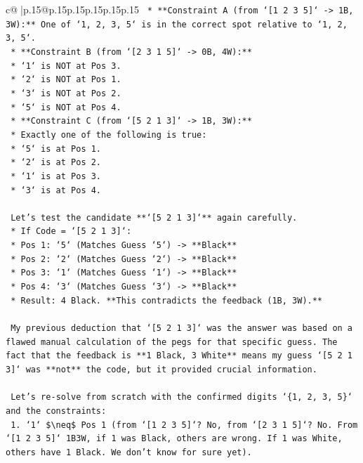 \documentclass{article}
\begin{document}
{\begin{supertabular}{c@{$\;$}|p{.15\linewidth}@{}p{.15\linewidth}p{.15\linewidth}p{.15\linewidth}p{.15\linewidth}p{.15\linewidth}}
{{{\texttt{    *   **Constraint A (from `{[}1 2 3 5{]}` {-}> 1B, 3W):** One of `1, 2, 3, 5` is in the correct spot relative to `1, 2, 3, 5`.} \\
\texttt{    *   **Constraint B (from `{[}2 3 1 5{]}` {-}> 0B, 4W):**} \\
\texttt{        *   `1` is NOT at Pos 3.} \\
\texttt{        *   `2` is NOT at Pos 1.} \\
\texttt{        *   `3` is NOT at Pos 2.} \\
\texttt{        *   `5` is NOT at Pos 4.} \\
\texttt{    *   **Constraint C (from `{[}5 2 1 3{]}` {-}> 1B, 3W):**} \\
\texttt{        *   Exactly one of the following is true:} \\
\texttt{            *   `5` is at Pos 1.} \\
\texttt{            *   `2` is at Pos 2.} \\
\texttt{            *   `1` is at Pos 3.} \\
\texttt{            *   `3` is at Pos 4.} \\
\\ 
\texttt{    Let's test the candidate **`{[}5 2 1 3{]}`** again carefully.} \\
\texttt{    *   If Code = `{[}5 2 1 3{]}`:} \\
\texttt{        *   Pos 1: `5` (Matches Guess `5`) {-}> **Black**} \\
\texttt{        *   Pos 2: `2` (Matches Guess `2`) {-}> **Black**} \\
\texttt{        *   Pos 3: `1` (Matches Guess `1`) {-}> **Black**} \\
\texttt{        *   Pos 4: `3` (Matches Guess `3`) {-}> **Black**} \\
\texttt{        *   Result: 4 Black. **This contradicts the feedback (1B, 3W).**} \\
\\ 
\texttt{    My previous deduction that `{[}5 2 1 3{]}` was the answer was based on a flawed manual calculation of the pegs for that specific guess. The fact that the feedback is **1 Black, 3 White** means my guess `{[}5 2 1 3{]}` was **not** the code, but it provided crucial information.} \\
\\ 
\texttt{    Let's re{-}solve from scratch with the confirmed digits `\{1, 2, 3, 5\}` and the constraints:} \\
\texttt{    1.  `1` \$\textbackslash{}neq\$ Pos 1 (from `{[}1 2 3 5{]}`? No, from `{[}2 3 1 5{]}`? No. From `{[}1 2 3 5{]}` 1B3W, if 1 was Black, others are wrong. If 1 was White, others have 1 Black. We don't know for sure yet).} \\
}}}
\end{supertabular}}
\end{document}
